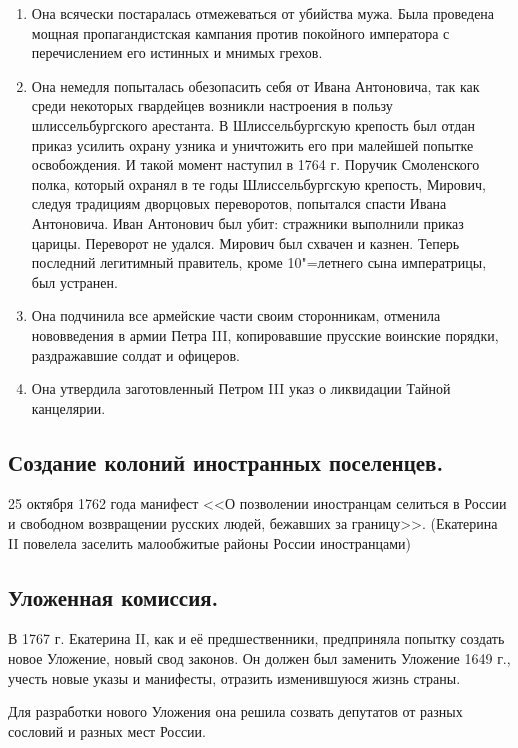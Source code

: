 \begin{enumerate}
    \item{ Она всячески постаралась отмежеваться от убийства мужа. Была проведена мощная пропагандистская кампания против покойного императора с перечислением его истинных и мнимых грехов. }
    \item{ Она немедля попыталась обезопасить себя от Ивана Антоновича, так как среди некоторых гвардейцев возникли настроения в пользу шлиссельбургского арестанта. В Шлиссельбургскую крепость был отдан приказ усилить охрану узника и уничтожить его при малейшей попытке освобождения. И такой момент наступил в 1764 г. Поручик Смоленского полка, который охранял в те годы Шлиссельбургскую крепость, Мирович, следуя традициям дворцовых переворотов, попытался спасти Ивана Антоновича. Иван Антонович был убит: стражники выполнили приказ царицы. Переворот не удался. Мирович был схвачен и казнен. Теперь последний легитимный правитель, кроме 10"=летнего сына императрицы, был устранен. }
    \item{ Она подчинила все армейские части своим сторонникам, отменила нововведения в армии Петра III, копировавшие прусские воинские порядки, раздражавшие солдат и офицеров. }
    \item{ Она утвердила заготовленный Петром III указ о ликвидации Тайной канцелярии. }
\end{enumerate}

\subsection{Создание колоний иностранных поселенцев.}

25 октября 1762 года манифест <<О позволении иностранцам селиться в России и свободном возвращении русских людей, бежавших за границу>>. (Екатерина II повелела заселить малообжитые районы России иностранцами)

\subsection{Уложенная комиссия.}

В 1767 г. Екатерина II, как и её предшественники, предприняла попытку создать новое Уложение, новый свод законов. Он должен был заменить Уложение 1649 г., учесть новые указы и манифесты, отразить изменившуюся жизнь страны.

Для разработки нового Уложения она решила созвать депутатов от разных сословий и разных мест России. 

